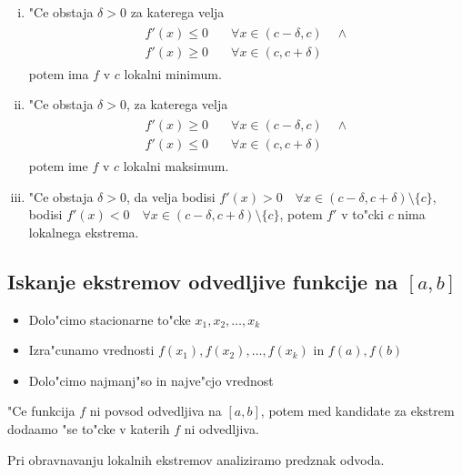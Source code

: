 \begin{enumerate}[(i)]
	\item "Ce obstaja $\delta > 0$ za katerega velja
	\begin{gather*}
	\begin{aligned}
		f'(x) \leq 0& \quad \forall x \in (c - \delta, c) \quad \land \\
		f'(x) \geq 0& \quad \forall x \in (c, c + \delta)
	\end{aligned}
	\end{gather*}
	potem ima $f$ v $c$ lokalni minimum.
	
	\item "Ce obstaja $\delta > 0$, za katerega velja
	\begin{gather*}
	\begin{aligned}
		f'(x) \geq 0& \quad \forall x \in (c - \delta, c) \quad \land \\
		f'(x) \leq 0& \quad \forall x \in (c, c + \delta)
	\end{aligned}
	\end{gather*}
	potem ime $f$ v $c$ lokalni maksimum.
	
	\item "Ce obstaja $\delta > 0$, da velja bodisi $f'(x) > 0 \quad \forall x \in (c - \delta, c + \delta) \setminus \{c\}$, bodisi $f'(x) < 0 \quad \forall x \in (c - \delta, c + \delta) \setminus \{c\}$, potem $f'$ v to"cki $c$ nima lokalnega ekstrema.
\end{enumerate}
%
\subsection{Iskanje ekstremov odvedljive funkcije na $[a, b]$}
\begin{itemize}
	\item Dolo"cimo stacionarne to"cke $x_1, x_2, \ldots, x_k$
	\item Izra"cunamo vrednosti $f(x_1), f(x_2), \ldots, f(x_k)$ in $f(a), f(b)$
	\item Dolo"cimo najmanj"so in najve"cjo vrednost
\end{itemize}
"Ce funkcija $f$ ni povsod odvedljiva na $[a, b]$, potem med kandidate za ekstrem dodaamo "se to"cke v katerih $f$ ni odvedljiva.

Pri obravnavanju lokalnih ekstremov analiziramo predznak odvoda.

